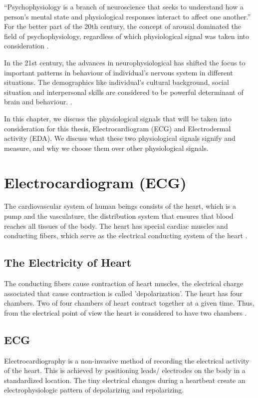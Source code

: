 \label{chapter:terminology}
\enquote{Psychophysiology is a branch of neuroscience that seeks to understand how a person’s mental state and physiological responses interact to affect one another.} \cite{def_psychophysiology} For the better part of the 20th century, the concept of arousal dominated the field of psychophysiology, regardless of which physiological signal was taken into consideration \cite{cacioppo_strong_2016_p_3_15}.

In the 21st century, the advances in neurophysiological has shifted the focus to important patterns in behaviour of individual's nervous system in different situations. The demographics like individual's cultural background, social situation and interpersonal skills are considered to be powerful determinant of brain and behaviour. \cite{cacioppo_strong_2016_p_3_15}.

In this chapter, we discuss the physiological signals that will be taken into consideration for this thesis, Electrocardiogram (ECG) and Electrodermal activity (EDA). We discuss what these two physiological signals signify and measure, and why we choose them over other physiological signals.

\section{Electrocardiogram (ECG)}
The cardiovascular system of human beings consists of the heart, which is a pump and the vasculature, the distribution system that ensures that blood reaches all tissues of the body. The heart has special cardiac muscles and conducting fibers, which serve as the electrical conducting system of the heart \cite{cacioppo_cardiovascular_2016_p_183_216}.

\subsection{The Electricity of Heart} The conducting fibers cause contraction of heart muscles, the electrical charge associated that cause contraction is called 'depolarization'. The heart has four chambers. Two of four chambers of heart contract together at a given time. Thus, from the electrical point of view the heart is considered to have two chambers \cite{hampton_ecg_2013}.

\subsection{ECG} Electrocardiography is a non-invasive method of recording the electrical activity of the heart. This is achieved by positioning leads/ electrodes on the body in a standardized location. The tiny electrical changes during a heartbeat create an electrophysiologic pattern of depolarizing and repolarizing.
